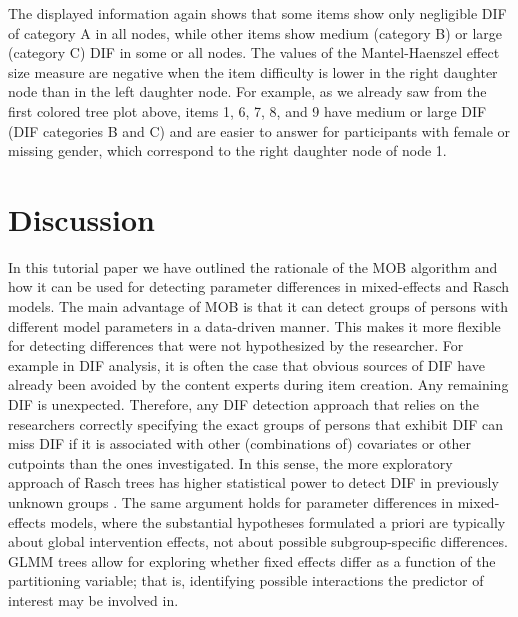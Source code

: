 \documentclass[doc,floatsintext,natbib]{apa7}
\begin{document}
The displayed information again shows that some items show only negligible DIF of category A in all nodes, while other items show medium (category B) or large (category C) DIF in some or all nodes. The values of the Mantel-Haenszel effect size measure are negative when the item difficulty is lower in the right daughter node than in the left daughter node. For example, as we already saw from the first colored tree plot above, items 1, 6, 7, 8, and 9 have medium or large DIF (DIF categories B and C) and are  easier to answer %
for participants with female or missing gender, which correspond to the right daughter node of node 1. %


\FloatBarrier
\section{Discussion}

In this tutorial paper we have outlined the rationale of the MOB algorithm and how it can be used for detecting parameter differences in mixed-effects and Rasch models. The main advantage of MOB is that it can detect groups of persons with different model parameters in a data-driven manner. This makes it more flexible for detecting differences that were not hypothesized by the researcher. For example in DIF analysis, it is often the case that obvious sources of DIF have already been avoided by the content experts during item creation. Any remaining DIF is unexpected. Therefore, any DIF detection approach that relies on the researchers correctly specifying the exact groups of persons that exhibit DIF can miss DIF if it is associated with other (combinations of) covariates or other cutpoints than the ones investigated. In this sense, the more exploratory approach of Rasch trees has higher statistical power to detect DIF in previously unknown groups \citep{StrKopZei:2015:P}. The same argument holds for parameter differences in mixed-effects models, where the substantial hypotheses formulated a priori are typically about global intervention effects, not about possible subgroup-specific differences. GLMM trees allow for exploring whether fixed effects differ as a function of the partitioning variable; that is, identifying possible interactions the predictor of interest may be involved in.
\end{document}
